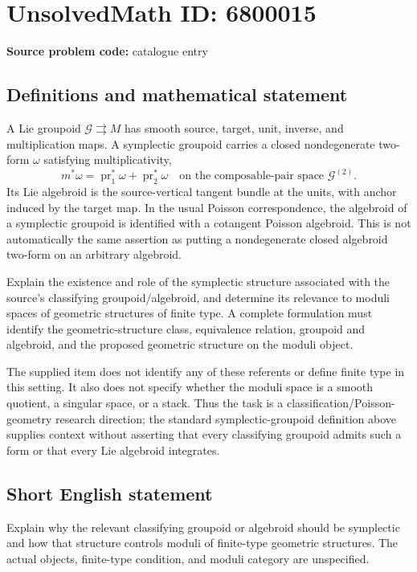 \documentclass[11pt]{article}
\begin{document}
\section*{UnsolvedMath ID: 6800015}
\textbf{Source problem code:} catalogue entry
\subsection{Definitions and mathematical statement}
A Lie groupoid $\mathcal G\rightrightarrows M$ has smooth source, target, unit, inverse, and multiplication maps. A symplectic groupoid carries a closed nondegenerate two-form $\omega$ satisfying multiplicativity,
\[
m^*\omega=\operatorname{pr}_1^*\omega+\operatorname{pr}_2^*\omega
\quad\text{on the composable-pair space }\mathcal G^{(2)}.
\]
Its Lie algebroid is the source-vertical tangent bundle at the units, with anchor induced by the target map. In the usual Poisson correspondence, the algebroid of a symplectic groupoid is identified with a cotangent Poisson algebroid. This is not automatically the same assertion as putting a nondegenerate closed algebroid two-form on an arbitrary algebroid.

Explain the existence and role of the symplectic structure associated with the source's classifying groupoid/algebroid, and determine its relevance to moduli spaces of geometric structures of finite type. A complete formulation must identify the geometric-structure class, equivalence relation, groupoid and algebroid, and the proposed geometric structure on the moduli object.

The supplied item does not identify any of these referents or define finite type in this setting. It also does not specify whether the moduli space is a smooth quotient, a singular space, or a stack. Thus the task is a classification/Poisson-geometry research direction; the standard symplectic-groupoid definition above supplies context without asserting that every classifying groupoid admits such a form or that every Lie algebroid integrates.
\subsection{Short English statement}
Explain why the relevant classifying groupoid or algebroid should be symplectic and how that structure controls moduli of finite-type geometric structures. The actual objects, finite-type condition, and moduli category are unspecified.
\end{document}
